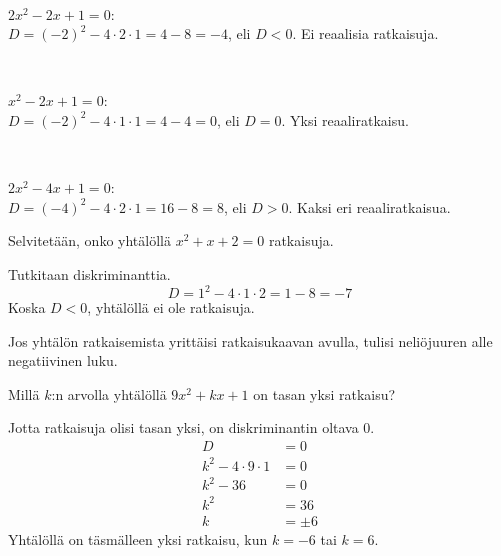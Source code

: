 \begin{esimerkki}
\ \\
\parbox{4.5cm}{
\begin{kuvaajapohja}{1}{-1}{3}{-1}{3}
\end{kuvaajapohja}
}
\parbox{6cm}{$2x^2-2x+1=0$:\\$D=(-2)^2-4 \cdot 2 \cdot 1=4-8=-4$, eli $D <0$. Ei reaalisia ratkaisuja.}
\\
\parbox{4.5cm}{
\begin{kuvaajapohja}{1}{-1}{3}{-1}{3}
\end{kuvaajapohja}
}
\parbox{6cm}{$x^2-2x+1=0$:\\$D=(-2)^2-4 \cdot 1 \cdot 1=4-4=0$, eli $D = 0$. Yksi reaaliratkaisu.}
\\
\parbox{4.5cm}{
\begin{kuvaajapohja}{1}{-1}{3}{-2}{2}
\end{kuvaajapohja}
}
\parbox{6cm}{$2x^2-4x+1=0$:\\$D=(-4)^2-4 \cdot 2 \cdot 1=16-8=8$, eli $D > 0$. Kaksi eri reaaliratkaisua.}
\end{esimerkki}

\newpage

\begin{esimerkki}
Selvitetään, onko yhtälöllä $x^2+x+2=0$ ratkaisuja.

Tutkitaan diskriminanttia.
\[D=1^2-4\cdot 1 \cdot 2 = 1-8 = -7\]
Koska $D<0$, yhtälöllä ei ole ratkaisuja.

Jos yhtälön ratkaisemista yrittäisi ratkaisukaavan avulla, tulisi neliöjuuren alle negatiivinen luku.
\end{esimerkki}

\begin{esimerkki}
Millä $k$:n arvolla yhtälöllä $9x^2+kx+1$ on tasan yksi ratkaisu?

Jotta ratkaisuja olisi tasan yksi, on diskriminantin oltava 0.
\begin{align*}
D &= 0\\
k^2-4\cdot 9\cdot 1 &= 0\\
k^2-36 &= 0\\
k^2 &= 36\\
k &= \pm 6
\end{align*}
Yhtälöllä on täsmälleen yksi ratkaisu, kun $k=-6$ tai $k=6$.
\end{esimerkki}